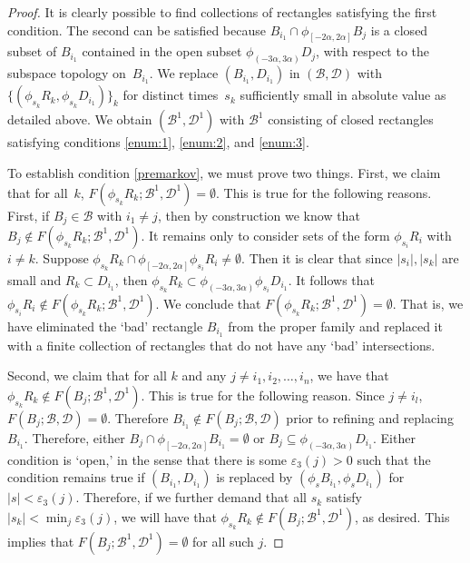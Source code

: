 \documentclass[10pt]{amsart}
\let\mathcal\mathscr
\let\epsilon\varepsilon
\theoremstyle{definition}
\numberwithin{equation}{section}
\newcommand\BBB{\mathcal B}
\begin{document}
\begin{proof}
It is clearly possible to find collections of rectangles satisfying the first condition. The second can be satisfied because $B_{i_1} \cap \phi_{[-2\alpha, 2\alpha]}B_j$ is a closed subset of $B_{i_1}$ contained in the open subset $\phi_{(-3\alpha,3\alpha)} D_j$, with respect to the subspace topology on~$B_{i_1}$.
We replace $(B_{i_1}, D_{i_1})$ in $(\mathcal{B}, \mathcal{D})$ with $\{(\phi_{s_{k}}R_{k}, \phi_{s_{k}} D_{i_1})\}_k$ for distinct times~$s_{k}$ sufficiently small in absolute value as detailed above. We obtain $(\mathcal{B}^1, \mathcal{D}^1)$ with $\mathcal{B}^1$ consisting of closed rectangles satisfying conditions \eqref{enum:1}, \eqref{enum:2}, and \eqref{enum:3}.

To establish condition \eqref{premarkov}, we must prove two things. First, we claim that for all~$k$, $F(\phi_{s_{k}}R_{k}; \mathcal{B}^1, \mathcal{D}^1) = \emptyset$. This is true for the following reasons. First, if $B_j \in \BBB$ with $i_1 \neq j$, then by construction we know that $B_j \notin F(\phi_{s_{k}}R_{k}; \mathcal{B}^1,\mathcal{D}^1)$. It remains only to consider sets of the form $\phi_{s_{i}}R_{i}$ with $i \neq k$. Suppose $\phi_{s_{k}}R_{k} \cap \phi_{[-2\alpha, 2 \alpha]} \phi_{s_{i}}R_{i} \neq \emptyset$. Then it is clear that since $|s_i|, |s_k|$ are small and $R_k \subset D_{i_1}$, then $\phi_{s_{k}}R_{k} \subset \phi_{(-3 \alpha, 3 \alpha)} \phi_{s_i} D_{i_1}$. It follows that $\phi_{s_{i}}R_{i} \notin F(\phi_{s_{k}}R_{k}; \mathcal{B}^1,\mathcal{D}^1)$. We conclude that $F(\phi_{s_{k}}R_{k}; \mathcal{B}^1, \mathcal{D}^1) = \emptyset$.
That is, we have eliminated the `bad' rectangle $B_{i_1}$ from the proper family and replaced it with a finite collection of rectangles that do not have any `bad' intersections.

Second, we claim that for all $k$ and any $j \neq i_1, i_2, \ldots, i_n$, we have that $\phi_{s_k}R_k \notin F(B_j; \mathcal{B}^1,\mathcal{D}^1)$. This is true for the following reason. Since $j \neq i_l$, $F(B_j;\mathcal{B},\mathcal{D}) = \emptyset$. Therefore $B_{i_1}\notin F(B_j; \mathcal{B},\mathcal{D})$ prior to refining and replacing $B_{i_1}$. Therefore, either $B_j \cap \phi_{[-2\alpha,2\alpha]}B_{i_1} = \emptyset$ or $B_j\subseteq \phi_{(-3\alpha,3\alpha)}D_{i_1}$. Either condition is `open,' in the sense that there is some $\epsilon_3(j)>0$ such that the condition remains true if $(B_{i_1},D_{i_1})$ is replaced by $(\phi_s B_{i_1}, \phi_s D_{i_1})$ for $|s|<\epsilon_3(j)$. Therefore, if we further demand that all $s_k$ satisfy $|s_k|<\min_j \epsilon_3(j)$, we will have that $\phi_{s_k}R_k \notin F(B_j; \mathcal{B}^1,\mathcal{D}^1)$, as desired. This implies that $F(B_j;\mathcal{B}^1,\mathcal{D}^1)=\emptyset$ for all such $j$.


\end{proof}
\end{document}
